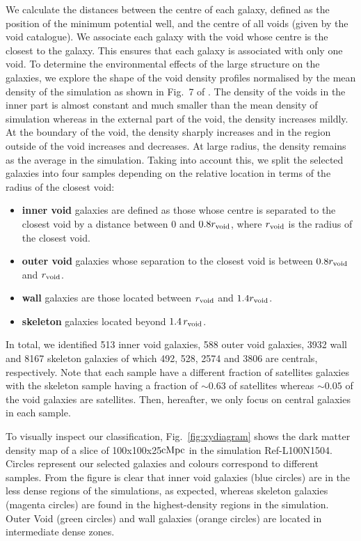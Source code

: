 \documentclass[a4paper,fleqn,usenatbib,letter]{mnras}
\newcommand{\cMpc}{\rm cMpc}
\newcommand{\REF}{Ref-L100N1504}
\newcommand{\Rvoid}{r_{\rm void} }
\begin{document}
We calculate  the distances between the centre of each galaxy, defined as the position of the minimum potential well, and  the centre of all voids (given  by the void catalogue). We associate each galaxy with the void whose centre is the closest to the galaxy. This ensures that  each galaxy  is associated with only one void.
To determine the environmental  effects of the large structure on the galaxies, we explore the shape of the void density profiles normalised by the mean density of the simulation as shown in  Fig.~7 of \citealt{paillas2017}. The density of the voids in the inner part is almost constant and much smaller than the mean density of simulation whereas in the external part of the void, the density increases mildly. At the boundary of the void, the density sharply increases and in the region outside of the void increases and decreases. At large radius, the density remains as the average in the simulation. Taking into account this, we split the selected galaxies into four samples depending on the relative location in terms of the radius of the closest void:
\begin{itemize}
    \item {\bf inner void} galaxies are defined as those whose centre is separated to the closest void  by a distance  between $0$ and $0.8\Rvoid$, where $\Rvoid$ is the radius of the closest void.
    \item {\bf outer void} galaxies whose separation to the closest void is   between $0.8\Rvoid$ and $\Rvoid$. 
    \item {\bf wall} galaxies are those located  between $\Rvoid$ and $1.4\Rvoid$. 
    \item {\bf skeleton} galaxies located beyond $1.4\,\Rvoid$. 
    
\end{itemize}
In total, we identified 513 inner void galaxies, 588 outer void galaxies, 3932 wall and  8167 skeleton galaxies of which  492, 528, 2574 and 3806  are centrals, respectively. Note that  each sample have a different fraction of satellites galaxies with the skeleton sample having a fraction of  $\sim 0.63$ of satellites  whereas $\sim 0.05$ of the void galaxies  are satellites. Then,  hereafter, we only focus on central galaxies in each sample. 


To visually inspect our classification, Fig.~\ref{fig:xydiagram} shows the dark matter density map of a slice of 100x100x25$\cMpc$ in the simulation \REF. Circles represent our selected galaxies and colours correspond to different samples. From the figure is clear that inner void galaxies (blue circles) are in the less dense regions of the simulations, as expected,  whereas skeleton galaxies (magenta circles) are found in the highest-density regions in the simulation. Outer Void (green circles) and wall galaxies (orange circles) are located in intermediate dense zones. 
\end{document}
